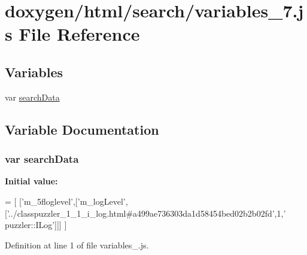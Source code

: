 \hypertarget{a00111}{}\section{doxygen/html/search/variables\+\_\+7.js File Reference}
\label{a00111}
\subsection*{Variables}
\begin{DoxyCompactItemize}
\item 
var \hyperlink{a00111_ad01a7523f103d6242ef9b0451861231e}{search\+Data}
\end{DoxyCompactItemize}


\subsection{Variable Documentation}
\hypertarget{a00111_ad01a7523f103d6242ef9b0451861231e}{}
\subsubsection[{search\+Data}]{\setlength{\rightskip}{0pt plus 5cm}var search\+Data}\label{a00111_ad01a7523f103d6242ef9b0451861231e}
{\bfseries Initial value\+:}
\begin{DoxyCode}
=
[
  [\textcolor{stringliteral}{'m\_5floglevel'},[\textcolor{stringliteral}{'m\_logLevel'},[\textcolor{stringliteral}{'../classpuzzler\_1\_1\_i\_log.html#a499ae736303da1d58454bed02b2b02fd'},1,\textcolor{stringliteral}{'
      puzzler::ILog'}]]]
]
\end{DoxyCode}


Definition at line 1 of file variables\+\_.\+js.

